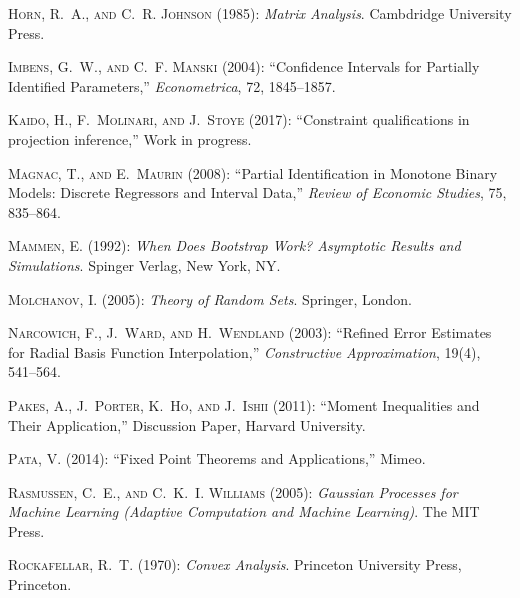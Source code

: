\documentclass[letterpaper,11pt]{article}
\theoremstyle{myplain}
\theoremstyle{mydefinition}
\theoremstyle{myremark}
\numberwithin{equation}{section}
\numberwithin{figure}{section}
\begin{document}
\begin{thebibliography}{}
\textsc{Horn, R.~A.,  {\small and} C.~R. Johnson}  (1985): \emph{Matrix
  Analysis}. Cambdridge University Press.

\textsc{Imbens, G.~W.,  {\small and} C.~F. Manski}  (2004): ``Confidence
  Intervals for Partially Identified Parameters,'' \emph{Econometrica}, 72,
  1845--1857.

\textsc{Kaido, H., F.~Molinari,  {\small and} J.~Stoye}  (2017): ``Constraint
  qualifications in projection inference,'' Work in progress.

\textsc{Magnac, T.,  {\small and} E.~Maurin}  (2008): ``Partial Identification
  in Monotone Binary Models: Discrete Regressors and Interval Data,''
  \emph{Review of Economic Studies}, 75, 835--864.

\textsc{Mammen, E.}  (1992): \emph{When Does Bootstrap Work? Asymptotic Results
  and Simulations}. Spinger Verlag, New York, NY.

\textsc{Molchanov, I.}  (2005): \emph{Theory of Random Sets}. Springer, London.

\textsc{Narcowich, F., J.~Ward,  {\small and} H.~Wendland}  (2003): ``Refined
  Error Estimates for Radial Basis Function Interpolation,'' \emph{Constructive
  Approximation}, 19(4), 541--564.

\textsc{Pakes, A., J.~Porter, K.~Ho,  {\small and} J.~Ishii}  (2011): ``Moment
  Inequalities and Their Application,'' Discussion Paper, Harvard University.

\textsc{Pata, V.}  (2014): ``Fixed Point Theorems and Applications,'' Mimeo.

\textsc{Rasmussen, C.~E.,  {\small and} C.~K.~I. Williams}  (2005):
  \emph{Gaussian Processes for Machine Learning (Adaptive Computation and
  Machine Learning)}. The MIT Press.

\textsc{Rockafellar, R.~T.}  (1970): \emph{Convex Analysis}. Princeton
  University Press, Princeton.


\end{thebibliography}
\end{document}
